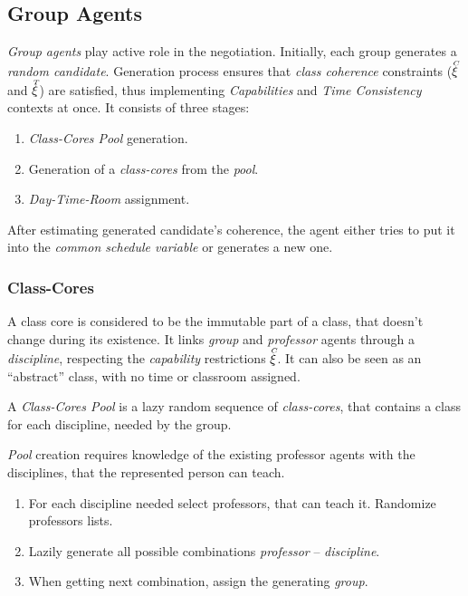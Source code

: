 \documentclass[../../ThesisDoc]{subfiles}
\begin{document}
\providecommand{\rootdir}{../..}


\providecommand{\seccmd}[1]{\secpartc{#1}}

\subsection{Group Agents}

\emph{Group agents} play active role in the negotiation.
Initially, each group generates a \emph{random candidate}.
Generation process ensures that \emph{class coherence} constraints
($\accentset{C}{\xi}$ and $\accentset{T}{\xi}$) are satisfied, thus implementing \textit{Capabilities}
and \textit{Time Consistency} contexts at once. It consists of three stages:
\begin{enumerate}
  \item \emph{Class-Cores Pool} generation.
  \item Generation of a \emph{class-cores} from the \emph{pool}.
  \item \emph{Day-Time-Room} assignment.
\end{enumerate}


\noindent
After estimating generated candidate's coherence, the agent either tries to put
it into the \emph{common schedule variable} or generates a new one.


\subsubsection{Class-Cores}
\label{sec:solution-CC}

A class core is considered to be the immutable part of a class, that doesn't
change during its existence. It links \emph{group} and \emph{professor} agents
through a \emph{discipline}, respecting the \emph{capability} restrictions $\accentset{C}{\xi}$.
It can also be seen as an ``abstract'' class, with no time or classroom assigned.

A \emph{Class-Cores Pool} is a lazy random sequence of \emph{class-cores},
that contains a class for each discipline, needed by the group.

\emph{Pool} creation requires knowledge of the existing professor agents with
the disciplines, that the represented person can teach.
\begin{enumerate}
  \item For each discipline needed select professors, that can teach it.
        Randomize professors lists.
  \item Lazily generate all possible combinations \emph{professor} -- \emph{discipline}.
  \item When getting next combination, assign the generating \emph{group}.
\end{enumerate}
\end{document}
